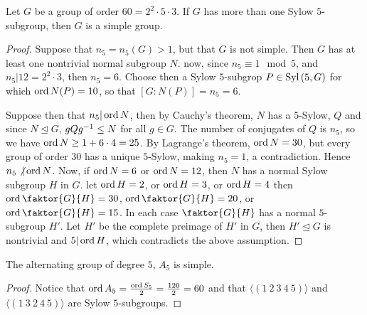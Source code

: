 \begin{theorem}\label{theorem_4.6.1}
  Let $G$ be a group of order $60=2^2 \cdot 5 \cdot 3$. If $G$ has more than
  one Sylow $5$-subgroup, then $G$ is a simple group.
\end{theorem}
\begin{proof}
  Suppose that $n_5=n_5(G)>1$, but that $G$ is not simple. Then $G$ has at
  least one nontrivial normal subgroup $N$. now, since  $n_5 \equiv 1
  \mod{5}$, and $n_5|12=2^2 \cdot 3$, then $n_5=6$. Choose then a Sylow
  $5$-subgrop $P \in \operatorname{Syl}{(5,G)}$ for which $\operatorname{ord}{N(P)}=10$, so that
  $[G:N(P)]=n_5=6$.

  Suppose then that $n_5|\operatorname{ord}{N}$, then by Cauchy's theorem, $N$ has a
  $5$-Sylow, $Q$ and since $N \unlhd G$, $gQg^{-1} \leq N$ for all $g \in G$.
  The number of conjugates of $Q$ is $n_5$, so we have $\operatorname{ord}{N} \geq 1+6 \cdot
  4=25$. By Lagrange's theorem, $\operatorname{ord}{N}=30$, but every group of order $30$
  has a unique  $5$-Sylow, making  $n_5=1$, a contradiction. Hence $n_5 \not|
  \operatorname{ord}{N}$. Now, if $\operatorname{ord}{N}=6$ or $\operatorname{ord}{N}=12$, then $N$ has a normal Sylow
  subgroup $H$ in $G$. let $\operatorname{ord}{H}=2$, or $\operatorname{ord}{H}=3$, or $\operatorname{ord}{H}=4$ then
  $\ord{\faktor{G}{H}}=30$, $\ord{\faktor{G}{H}}=20$, or
  $\ord{\faktor{G}{H}}=15$. In each case $\faktor{G}{H}$ has a normal
  $5$-subgroup  $H'$. Let  $H'$ be the complete preimage of  $H'$ in  $G$,
  then  $H' \unlhd G$ is nontrivial and  $5|\operatorname{ord}{H}$, which contradicts the
  above assumption.
\end{proof}
\begin{corollary}
  The alternating group of degree $5$,  $A_5$ is simple.
\end{corollary}
\begin{proof}
  Notice that $\operatorname{ord}{A_5}=\frac{\operatorname{ord}{S_5}}{2}=\frac{120}{2}=60$ and that
  $\langle (1 \ 2 \ 3 \ 4 \ 5) \rangle$ and $\langle (1 \ 3 \ 2 \ 4 \ 5)
  \rangle$ are Sylow $5$-subgroups.
\end{proof}

